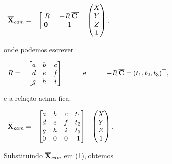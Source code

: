 \begin{center}
$
\begin{array}{ccc}
\overline{\mathbf{X}}_{\textit{cam}}=
&
\begin{bmatrix}
R&-R\,\overline{\bf C}\\
\,\,{\bf 0}^\top&\,\,1
\end{bmatrix}
&
\begin{pmatrix}
X\\
Y\\
Z\\
1
\end{pmatrix},
\end{array}
$
\end{center} 
onde podemos escrever

\begin{center}
$
\begin{array}{cccc}
R=
&
\begin{bmatrix}
a&b&c\\
d&e&f\\
g&h&i
\end{bmatrix}
&
\qquad\text{e}\qquad
&
-R\,\overline{\bf C}=(t_1,t_2,t_3)^\top,
\end{array}
$
\end{center}
e a relação acima fica:

\begin{center}
$
\begin{array}{ccc}
\overline{\mathbf{X}}_{\textit{cam}}=
&
\begin{bmatrix}
a&b&c&t_1\\
d&e&f&t_2\\
g&h&i&t_3\\
0&0&0&\,1
\end{bmatrix}
&
\begin{pmatrix}
X\\
Y\\
Z\\
1
\end{pmatrix}.
\end{array}
$
\end{center}

Substituindo $\overline{\mathbf{X}}_{\textit{cam}}$ em (1), obtemos


